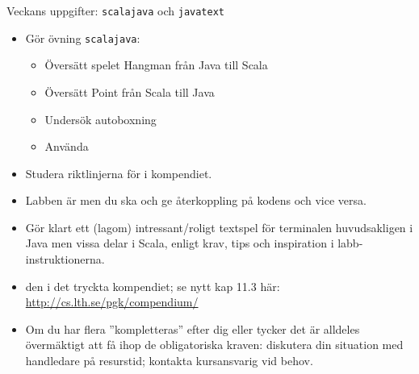 


\begin{Slide}{Veckans uppgifter: \texttt{scalajava} och \texttt{javatext}}\SlideFontSmall
{}
\begin{itemize}
\item Gör övning \texttt{scalajava}:
\begin{itemize}\SlideFontSmall
\item Översätt spelet Hangman från Java till Scala
\item Översätt Point från Scala till Java
\item Undersök autoboxning 
\item Använda 
\end{itemize}
\item Studera riktlinjerna för  i kompendiet.
\item Labben är  men du ska  och ge återkoppling på kodens  och vice versa.
\end{itemize}
\begin{itemize}
  \item Gör klart ett (lagom) intressant/roligt textspel för terminalen huvudsakligen i Java men vissa delar i Scala, enligt krav, tips och inspiration i labb-instruktionerna.
  \item {}  den i det tryckta kompendiet; se nytt kap 11.3 här: \url{http://cs.lth.se/pgk/compendium/}  
  \item Om du har flera ''kompletteras'' efter dig eller tycker det är alldeles övermäktigt att få ihop de obligatoriska kraven: diskutera din situation med handledare på resurstid; kontakta kursansvarig vid behov. 
\end{itemize}
\end{Slide}
